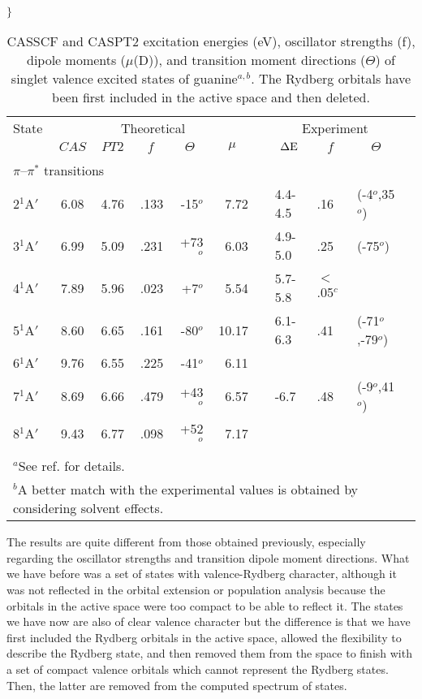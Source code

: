 \newbox\gurkbox
\setbox\gurkbox\hbox{$\Biggl\}$}
\ht\gurkbox=0pt
\dp\gurkbox=0pt
\def\gurka{\raise0.7pt\copy\gurkbox}
%
\begin{table}
\begin{center}
\caption{\label{tab:gua2}CASSCF and CASPT2 excitation energies (eV), oscillator strengths (f), dipole moments ($\mu$(D)), 
and transition moment directions ($\Theta$) of singlet valence excited states of guanine$^{a,b}$. The Rydberg orbitals have been first included in the active space and then deleted.}
\begin{tabular}{lccrrrrlllr}
\\ \hline \hline
State &  \multicolumn{5}{c}{Theoretical} &  & \multicolumn{3}{c}{Experiment} \\ \cline{2-6}\cline{8-10}
        &
  $CAS$ &
  $PT2$ &
  \multicolumn{1}{c}{$f$} &
  \multicolumn{1}{c}{$\Theta$} &
  \multicolumn{1}{c}{$\mu$} & & 
  \multicolumn{1}{c}{$\Delta{\rm E}$} &
  \multicolumn{1}{c}{$f$} &
  \multicolumn{1}{c}{$\Theta$} \\\hline
\\
\multicolumn{11}{l}{$\pi$--$\pi^*$ transitions} \\
2$^1$A$'$& 6.08 & 4.76 & .133 & -15$^o$& 7.72 & &4.4-4.5& .16 & (-4$^o$,35$^o$) \\
3$^1$A$'$& 6.99 & 5.09 & .231 & +73$^o$& 6.03 & & 4.9-5.0 & .25 & (-75$^o$) \\
4$^1$A$'$& 7.89 & 5.96 & .023 & +7$^o$&  5.54 & & 5.7-5.8 & $<$.05$^c$ \\
5$^1$A$'$& 8.60 & 6.65 & .161 & -80$^o$&10.17 & & 6.1-6.3 & .41&(-71$^o$,-79$^o$)\\
6$^1$A$'$& 9.76 & 6.55 & .225 & -41$^o$& 6.11 &  \\
7$^1$A$'$& 8.69 & 6.66 & .479 & +43$^o$& 6.57 & & \gurka 6.6-6.7 & .48 & (-9$^o$,41$^o$)\\
8$^1$A$'$& 9.43 & 6.77 & .098 & +52$^o$& 7.17 &  \\
\\ \hline \hline
\multicolumn{11}{l}{\footnotesize{$^a$See ref. \cite{Fuelscher:97a} for details.}} \\
\multicolumn{11}{l}{\footnotesize{$^b$A better match with the experimental values is obtained by considering solvent effects.}}\\
\end{tabular}
\end{center}
\end{table}
The results are quite different from those obtained previously, especially
regarding the
oscillator strengths and transition dipole moment directions. What we
have before was a set of states with valence-Rydberg character,
although it was not reflected in the orbital extension or population
analysis because the orbitals in the active space were too compact
to be able to reflect it. The states we have now are also of clear valence character
but the difference is that we have first included the Rydberg orbitals
in the active space, allowed the flexibility to describe the
Rydberg state, and then removed them from the space to finish with a 
set of compact valence orbitals which cannot represent the Rydberg states.
Then, the latter are removed from the computed spectrum of states.
 
